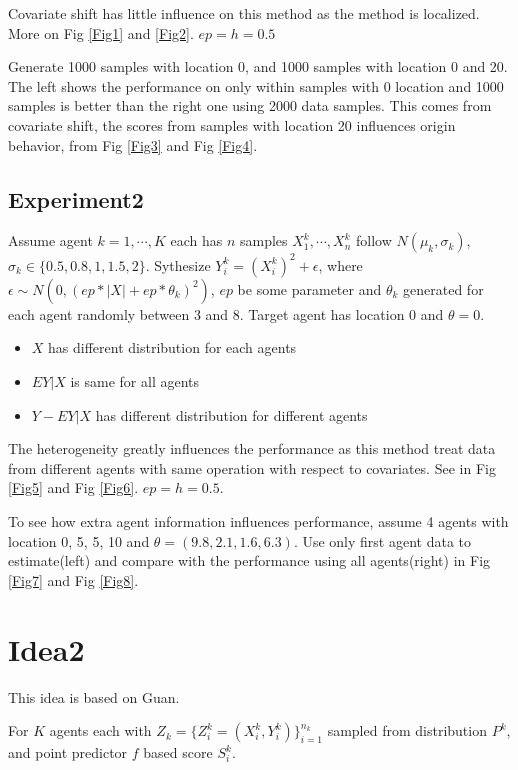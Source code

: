 \documentclass[12pt, a4paper, oneside]{article}
\begin{document}
    Covariate shift has little influence on this method as the method is localized. More on Fig \ref{Fig1} and \ref{Fig2}. $ep=h=0.5$
    

    Generate 1000 samples with location 0, and 1000 samples with location 0 and 20. The left shows the performance on only within samples with 0 location and 1000 samples is better than the right one using 2000 data samples. This comes from covariate shift, the scores from samples with location 20 influences origin behavior, from Fig \ref{Fig3} and Fig \ref{Fig4}.
    

\subsection{Experiment2}
    Assume agent $k=1,\cdots,K$ each has $n$ samples $X_1^k,\cdots,X_n^k$ follow $N(\mu_k,\sigma_k)$, $\sigma_k\in\{0.5,0.8,1,1.5,2\}$. Sythesize $Y_i^k=(X_i^k)^2+\epsilon$, where $\epsilon\sim N(0,(ep*|X|+ep*\theta_k)^2)$, $ep$ be some parameter and $\theta_k$ generated for each agent randomly between $3$ and $8$. Target agent has location $0$ and $\theta=0$.
    \begin{itemize}
        \item $X$ has different distribution for each agents
        \item $EY|X$ is same for all agents
        \item $Y-EY|X$ has different distribution for different agents
    \end{itemize}

    The heterogeneity greatly influences the performance as this method treat data from different agents with same operation with respect to covariates. See in Fig \ref{Fig5} and Fig \ref{Fig6}. $ep=h=0.5$.


    To see how extra agent information influences performance, assume 4 agents with location 0, 5, 5, 10 and $\theta=(9.8, 2.1, 1.6, 6.3)$. Use only first agent data to estimate(left) and compare with the performance using all agents(right) in Fig \ref{Fig7} and Fig \ref{Fig8}.


\newpage
\section{Idea2}
    This idea is based on Guan\cite{guan2023localized}.


    For $K$ agents each with $Z_k=\{Z_i^k=(X_i^k,Y_i^k)\}_{i=1}^{n_k}$ sampled from distribution $P^k$, and point predictor $f$ based score $S_i^k$.
\end{document}

